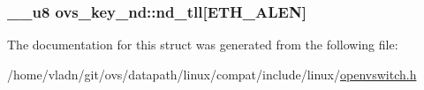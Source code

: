 \subsubsection[{nd\+\_\+tll}]{\setlength{\rightskip}{0pt plus 5cm}\+\_\+\+\_\+u8 ovs\+\_\+key\+\_\+nd\+::nd\+\_\+tll\mbox{[}E\+T\+H\+\_\+\+A\+L\+E\+N\mbox{]}}\label{structovs__key__nd_a66559abec4bf299ada50794d2f43f30d}


The documentation for this struct was generated from the following file\+:\begin{DoxyCompactItemize}
\item 
/home/vladn/git/ovs/datapath/linux/compat/include/linux/\hyperlink{openvswitch_8h}{openvswitch.\+h}\end{DoxyCompactItemize}
